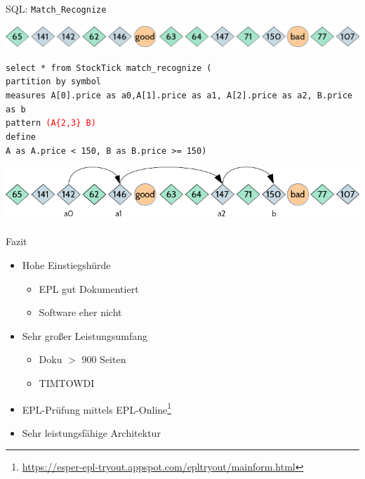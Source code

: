 \documentclass[usenames,dvipsnames]{beamer}
\begin{document}
\begin{frame}{SQL: \texttt{Match\_Recognize}}
\begin{center}
    \includegraphics[scale=0.4]{img/stream-2}
\end{center}

\begin{exampleblock}{}
\texttt{select * from StockTick \textcolor{Bittersweet}{match\_recognize} (\\
\textcolor{Bittersweet}{partition} by symbol\\
\textcolor{Bittersweet}{measures} A[0].price as a0,A[1].price as a1, A[2].price as a2, 
B.price as b\\
\textcolor{Bittersweet}{pattern} \textcolor{red}{(A\{2,3\} B)}\\
\textcolor{Bittersweet}{define}\\
A as A.price < 150,
B as B.price >= 150)
}
\end{exampleblock}

\begin{center}
    \includegraphics[scale=0.6]{img/solution-i}
\end{center}

\end{frame}

\begin{frame}{Fazit}
   \begin{itemize}
       \item Hohe Einstiegshürde
       \begin{itemize}
           \item EPL gut Dokumentiert
           \item Software eher nicht
       \end{itemize}
       \item Sehr großer Leistungsumfang
       \begin{itemize}
           \item Doku $>$ 900 Seiten
           \item TIMTOWDI
       \end{itemize}
       \item EPL-Prüfung mittels 
       EPL-Online\footnote{\url{https://esper-epl-tryout.appspot.com/epltryout/mainform.html}}
       \item Sehr leistungsfähige Architektur
   \end{itemize}
\end{frame}
\end{document}
